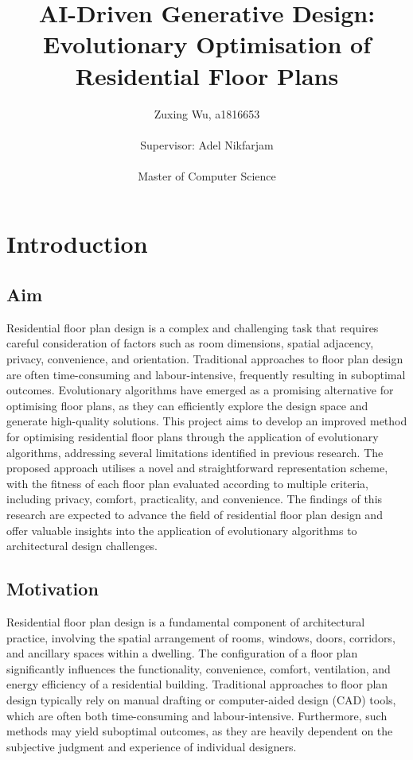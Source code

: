 \documentclass[]{article}
\title{\textbf{AI-Driven Generative Design: Evolutionary Optimisation of Residential Floor Plans}}
\author{Zuxing Wu, a1816653\\ \\Supervisor: Adel Nikfarjam\\ \\Master of Computer Science}
\begin{document}
\maketitle\nonumber

\newpage\nonumber

\tableofcontents

\newpage


\section{Introduction}
\subsection{Aim}
Residential floor plan design is a complex and challenging task that requires careful consideration of factors such as room dimensions, spatial adjacency, privacy, convenience, and orientation. Traditional approaches to floor plan design are often time-consuming and labour-intensive, frequently resulting in suboptimal outcomes. Evolutionary algorithms have emerged as a promising alternative for optimising floor plans, as they can efficiently explore the design space and generate high-quality solutions. This project aims to develop an improved method for optimising residential floor plans through the application of evolutionary algorithms, addressing several limitations identified in previous research. The proposed approach utilises a novel and straightforward representation scheme, with the fitness of each floor plan evaluated according to multiple criteria, including privacy, comfort, practicality, and convenience. The findings of this research are expected to advance the field of residential floor plan design and offer valuable insights into the application of evolutionary algorithms to architectural design challenges.

\subsection{Motivation}
Residential floor plan design is a fundamental component of architectural practice, involving the spatial arrangement of rooms, windows, doors, corridors, and ancillary spaces within a dwelling. The configuration of a floor plan significantly influences the functionality, convenience, comfort, ventilation, and energy efficiency of a residential building. Traditional approaches to floor plan design typically rely on manual drafting or computer-aided design (CAD) tools, which are often both time-consuming and labour-intensive. Furthermore, such methods may yield suboptimal outcomes, as they are heavily dependent on the subjective judgment and experience of individual designers.
\end{document}
